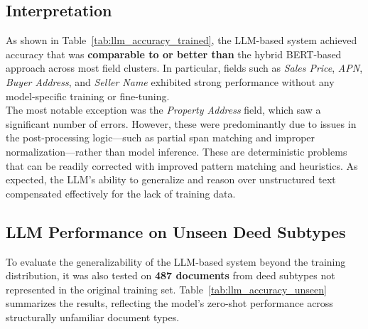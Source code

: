 \documentclass{article}
\begin{document}
\subsection{Interpretation}

As shown in Table~\ref{tab:llm_accuracy_trained}, the LLM-based system achieved accuracy that was \textbf{comparable to or better than} the hybrid BERT-based approach across most field clusters. In particular, fields such as \textit{Sales Price}, \textit{APN}, \textit{Buyer Address}, and \textit{Seller Name} exhibited strong performance without any model-specific training or fine-tuning. \\

The most notable exception was the \textit{Property Address} field, which saw a significant number of errors. However, these were predominantly due to issues in the post-processing logic—such as partial span matching and improper normalization—rather than model inference. These are deterministic problems that can be readily corrected with improved pattern matching and heuristics. As expected, the LLM's ability to generalize and reason over unstructured text compensated effectively for the lack of training data.


\subsection{LLM Performance on Unseen Deed Subtypes}

To evaluate the generalizability of the LLM-based system beyond the training distribution, it was also tested on \textbf{487 documents} from deed subtypes not represented in the original training set. Table~\ref{tab:llm_accuracy_unseen} summarizes the results, reflecting the model's zero-shot performance across structurally unfamiliar document types.

\vspace{2mm}
\end{document}

